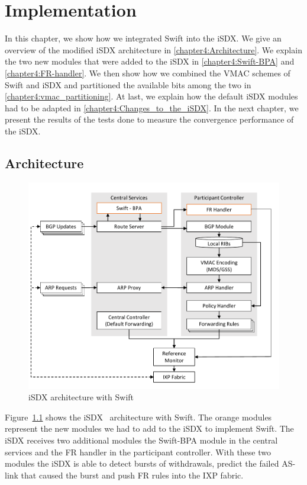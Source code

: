 \chapter{\label{chapter4}Implementation}

In this chapter, we show how we integrated Swift into the iSDX. We give an overview of the modified iSDX architecture in \ref{chapter4:Architecture}. We explain the two new modules that were added to the iSDX in \ref{chapter4:Swift-BPA} and  \ref{chapter4:FR-handler}. We then show how we combined the VMAC schemes of Swift and iSDX and partitioned the available bits among the two in \ref{chapter4:vmac_partitioning}. At last, we explain how the default iSDX modules had to be adapted in \ref{chapter4:Changes_to_the_iSDX}.
In the next chapter, we present the results of the tests done to measure the convergence performance of the iSDX.

\section{\label{chapter4:Architecture}Architecture}

\begin{figure}[h]
\center
\includegraphics[scale = 0.6]{Figures/design_sdx_swift_cropped.pdf}
\caption{iSDX architecture with Swift}
\label{fig:isdx_architecture_with_swift}
\end{figure}

Figure~\ref{fig:isdx_architecture_with_swift} shows the iSDX~\cite{feamster2013sdx} architecture with Swift. The orange modules represent the new modules we had to add to the iSDX to implement Swift. The iSDX receives two additional modules the Swift-BPA module in the central services and the FR handler in the participant controller. With these two modules the iSDX is able to detect bursts of withdrawals, predict the failed AS-link that caused the burst and push FR rules into the IXP fabric.

